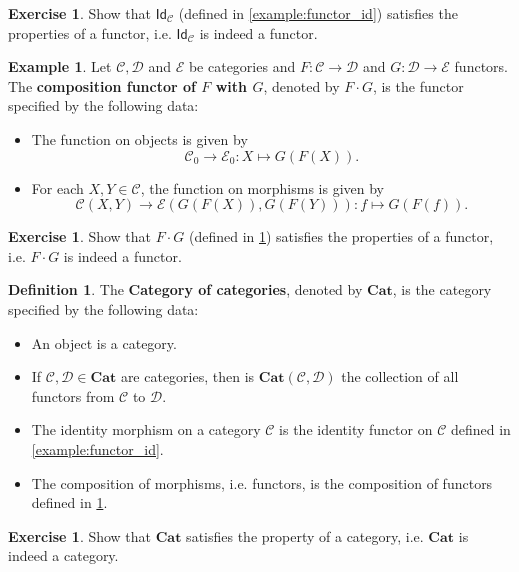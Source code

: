 \documentclass[a4paper,11pt, oneside,titlepage=false]{scrbook}
\theoremstyle{plain}
\theoremstyle{definition}
\newtheorem{dfn}[thm]{Definition}
\newtheorem{exa}[thm]{Example}
\newtheorem{exer}[thm]{Exercise}
\newcommand{\cfont}[1]{\ensuremath{\mathsf{#1}}}
\newcommand{\Cat}[1]{\mathcal{#1}}
\newcommand{\CC}{\Cat{C}}
\newcommand{\DD}{\Cat{D}}
\newcommand{\EE}{\Cat{E}}
\newcommand{\Catb}[1]{\mathbf{#1}}
\newcommand{\CAT}{\Catb{Cat}}
\newcommand{\Ob}[1]{{#1}_0}
\newcommand{\CHom}[3]{{#1}(#2,#3)}
\newcommand{\Id}[1][]{\cfont{Id}_{#1}}
\newcommand{\Comp}{\cdot}
\begin{document}
\begin{exer} Show that $\Id[\CC]$ (defined in \cref{example:functor_id}) satisfies the properties of a functor, i.e. $\Id[\CC]$ is indeed a functor.
\end{exer}

\begin{exa}\label{example:functor_comp} Let $\CC,\DD$ and $\EE$ be  categories and $F:\CC\to\DD$ and $G:\DD\to\EE$ functors. The \textbf{composition functor of $F$ with $G$}, denoted by $F\Comp G$, is the functor specified by the following data:
\begin{itemize}
\item The function on objects is given by
\[
\Ob{\CC}\to \Ob{\EE}: X\mapsto G(F(X)).
\]
\item For each $X,Y\in\CC$, the function on morphisms is given by
\[
\CHom \CC X Y\to \CHom{\EE}{G(F(X))}{G(F(Y))}: f\mapsto G(F(f)).
\]
\end{itemize}
\end{exa}

\begin{exer} Show that $F\Comp G$ (defined in \cref{example:functor_comp}) satisfies the properties of a functor, i.e. $F\Comp G$ is indeed a functor.
\end{exer}

\begin{dfn} The \textbf{Category of categories}, denoted by $\CAT$, is the category specified by the following data:
\begin{itemize}
\item An object is a category.
\item If $\CC, \DD\in\CAT$ are categories, then is $\CHom \CAT \CC \DD$ the collection of all functors from $\CC$ to $\DD$.
\item The identity morphism on a category $\CC$ is the identity functor on $\CC$ defined in \cref{example:functor_id}.
\item The composition of morphisms, i.e. functors, is the composition of functors defined in \cref{example:functor_comp}.
\end{itemize} 
\end{dfn}

\begin{exer} Show that $\CAT$ satisfies the property of a category, i.e. $\CAT$ is indeed a category.
\end{exer}
\end{document}
